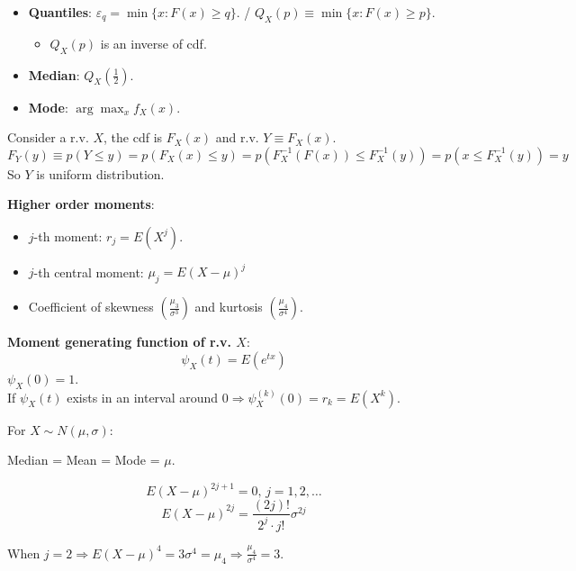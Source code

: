 \begin{itemize}
    \item \textbf{Quantiles}: $\varepsilon_q = \min\{x: F(x) \geq q\}$. / $Q_X(p) \equiv \min\{x: F(x) \geq p\}$. \begin{itemize}
              \item $Q_X(p)$ is an inverse of cdf.
          \end{itemize}
    \item \textbf{Median}: $Q_X(\frac{1}{2})$.
    \item \textbf{Mode}: $\arg \max_{x} f_X(x)$.
\end{itemize}

Consider a r.v. $X$, the cdf is $F_X(x)$ and r.v. $Y \equiv F_X(x)$. \[
    F_Y(y) \equiv p(Y \leq y) = p(F_X(x) \leq y) = p(F_X^{-1}(F(x))  \leq F_X^{-1}(y) ) = p(x \leq F_X^{-1}(y)) = y
\] So $Y$ is uniform distribution.

\textbf{Higher order moments}: \begin{itemize}
    \item $j$-th moment: $r_j = E(X^j)$.
    \item $j$-th central moment: $\mu_j = E(X-\mu)^j$
    \item Coefficient of skewness $(\frac{\mu_3}{\sigma ^{3}})$ and kurtosis $(\frac{\mu_4}{\sigma ^{4}})$.
\end{itemize}

\textbf{Moment generating function of r.v. $X$}: \[
    \psi_X(t) = E(e^{tx})
\]
$\psi_X(0) = 1$.\\
If $\psi_X(t)$ exists in an interval around $0 \Longrightarrow \psi^{(k)}_X(0) = r_k = E(X^k)$.

\begin{example*}
    For $X \sim N(\mu, \sigma)$:

    Median = Mean = Mode = $\mu$.

    \[
        E(X - \mu)^{2j+1} = 0, \, j = 1,2,\dots
    \]\[
        E(X-\mu)^{2j} = \frac{(2j)!}{2^j \cdot j!} \sigma^{2j}
    \]

    When $j = 2 \Longrightarrow E(X-\mu)^4 = 3\sigma^{4} = \mu_4 \Longrightarrow \frac{\mu_4}{\sigma ^{4}} = 3$.
\end{example*}